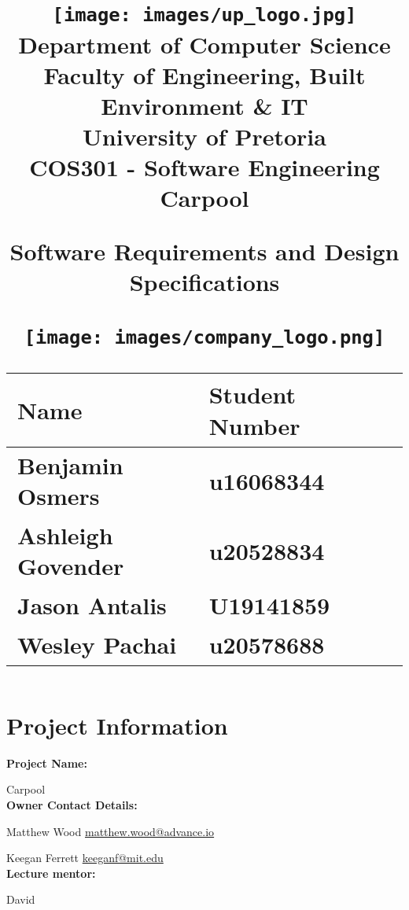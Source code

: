 \documentclass[hidelinks, 12pt, a4paper]{article}
\author{}
\date{}
\title
{
	\texttt{[image: images/up\_logo.jpg]} \\
	Department of Computer Science \\
	Faculty of Engineering, Built Environment \& IT\\
	University of Pretoria \\
	\vspace{0.5cm}
	\Huge COS301 -
	Software Engineering\\
	\vspace{1cm}
	{\Huge Carpool}\\
	\begin{Large}
		Software Requirements and Design Specifications
	\end{Large}
	\vspace{0.5cm}
	
    \begin{center}
    \noindent
    \texttt{[image: images/company\_logo.png]} 
    \vspace{0.5cm}
    \begin{table}[h]
    \centering
    \begin{tabular}{|l|l|l|}
    \hline
    Name  & Student Number\\ \hline
    Benjamin Osmers & u16068344 \\ \hline
    Ashleigh Govender &  u20528834      \\ \hline
    Jason Antalis     & U19141859     \\ \hline
    Wesley Pachai & u20578688    \\ \hline
            
    \end{tabular}
    \end{table}
    \end{center}
    }
\begin{document}
\maketitle


\newpage
\tableofcontents
\newpage
\section{Project Information}

\qquad \textbf{Project Name:}

\qquad  \qquad Carpool\\

\textbf{Owner Contact Details:}

\qquad  \qquad Matthew Wood \qquad \qquad \href{matthew.wood@advance.io}{matthew.wood@advance.io} \qquad \qquad

\qquad  \qquad Keegan Ferrett \qquad \qquad \href{keeganf@mit.edu}{keeganf@mit.edu}\\


\textbf{Lecture mentor:}

\qquad  \qquad David  \qquad \qquad \href{}{} \qquad \qquad

\vspace{1.5cm}
\end{document}
